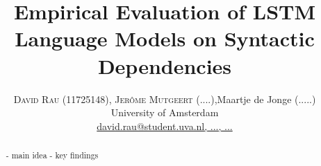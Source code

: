 \documentclass[twoside]{article}
\title{\vspace{-15mm}\fontsize{24pt}{10pt}\selectfont\textbf{
Empirical Evaluation of LSTM Language Models
on Syntactic Dependencies
}} %
\author{
\large
\textsc{David Rau (11725148), Jer\^ome Mutgeert (....)},Maartje de Jonge (.....) \\[2mm] %
\normalsize University of Amsterdam \\ %
\normalsize \href{mailto:david.rau@student.uva.nl, ...,...}{david.rau@student.uva.nl, ..., ...} %
\vspace{-5mm}
}
\date{}
\begin{document}
\maketitle %

\thispagestyle{fancy} %


\begin{abstract}

\noindent 
- main idea
- key findings

\end{abstract}

\end{document}
